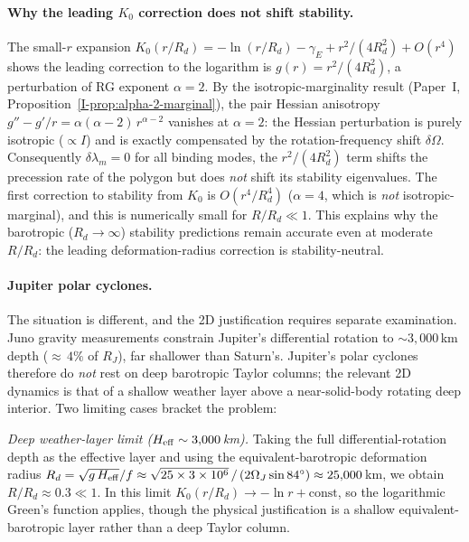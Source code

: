 \paragraph{Why the leading $K_0$ correction does not shift stability.}
The small-$r$ expansion $K_0(r/R_d) = -\ln(r/R_d) - \gamma_E
+ r^2/(4R_d^2) + O(r^4)$ shows the leading correction to the
logarithm is $g(r) = r^2/(4R_d^2)$, a perturbation of
RG exponent $\alpha = 2$.  By the isotropic-marginality result
(Paper~I, Proposition~\ref{I-prop:alpha-2-marginal}), the pair
Hessian anisotropy $g'' - g'/r = \alpha(\alpha{-}2)\,r^{\alpha-2}$
vanishes at $\alpha = 2$: the Hessian perturbation is
purely isotropic ($\propto I$) and is exactly compensated by
the rotation-frequency shift $\delta\Omega$.
Consequently $\delta\lambda_m = 0$ for all binding modes, the
$r^2/(4R_d^2)$ term shifts the precession rate of the polygon but
does \emph{not} shift its stability eigenvalues.
The first correction to stability from $K_0$ is $O(r^4/R_d^4)$
($\alpha = 4$, which is \emph{not} isotropic-marginal), and this
is numerically small for $R/R_d \ll 1$.
This explains why the barotropic ($R_d \to \infty$) stability
predictions remain accurate even at moderate $R/R_d$: the
leading deformation-radius correction is stability-neutral.

\paragraph{Jupiter polar cyclones.}
The situation is different, and the 2D justification
requires separate examination.  Juno gravity measurements
\citep{Kaspi2018} constrain Jupiter's differential rotation to
$\sim\!3{,}000$\,km depth (${\approx}\,4\%$ of $R_J$), far shallower
than Saturn's.  Jupiter's polar cyclones therefore do \emph{not} rest
on deep barotropic Taylor columns; the relevant 2D dynamics is that of
a shallow weather layer above a near-solid-body rotating deep interior.
Two limiting cases bracket the problem:

\textit{Deep weather-layer limit ($H_{\rm eff} \sim 3{,}000$\,km).}
Taking the full differential-rotation depth as the effective layer
and using the equivalent-barotropic deformation radius
$R_d = \sqrt{g\,H_{\rm eff}}/f \approx \sqrt{25 \times 3\times10^6}\,/\,
(2\Omega_J\sin 84^\circ) \approx 25{,}000$\,km, we obtain
$R/R_d \approx 0.3 \ll 1$.  In this limit
$K_0(r/R_d) \to -\ln r + \mathrm{const}$, so the logarithmic
Green's function applies, though the physical justification is
a shallow equivalent-barotropic layer rather than a deep Taylor column.

